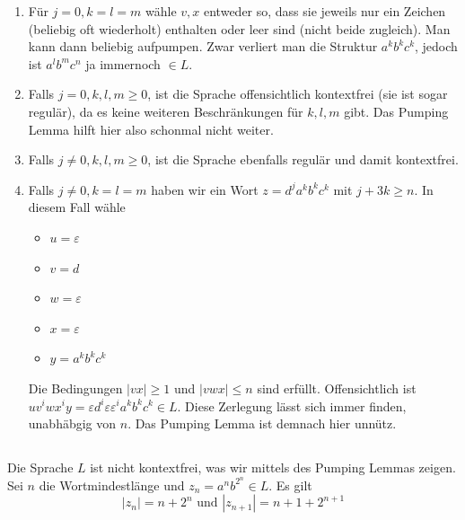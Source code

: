 \documentclass{article}
\begin{document}
\let\oldlabelenumi\labelenumi
\renewcommand{\labelenumi}{\textbf{Fall \arabic*:}}
\begin{enumerate}[leftmargin=*]
   \item Für $j = 0, k=l=m$ wähle $v,x$ entweder so, dass sie jeweils nur ein
      Zeichen (beliebig oft wiederholt) enthalten oder leer sind (nicht beide
      zugleich). Man kann dann beliebig aufpumpen. Zwar verliert man die
      Struktur $a^kb^kc^k$, jedoch ist $a^lb^mc^n$ ja immernoch $\in L$.
   \item 
      Falls $j=0,k,l,m \ge 0$, ist die Sprache offensichtlich kontextfrei (sie
      ist sogar regulär), da es keine weiteren Beschränkungen für $k,l,m$ gibt. Das
      Pumping Lemma hilft hier also schonmal nicht weiter.
   \item Falls $j \neq 0, k, l, m \ge 0$, ist die Sprache ebenfalls regulär und
      damit kontextfrei.
   \item
      Falls $j \neq 0, k = l = m$ haben wir ein Wort $z =
      d^ja^kb^kc^k$ mit $j+3k\ge n$. In diesem Fall wähle
      \begin{itemize}
         \item $u=\varepsilon$
         \item $v = d$
         \item $w=\varepsilon$
         \item $x=\varepsilon$
         \item $y=a^kb^kc^k$
      \end{itemize}
      Die Bedingungen $|vx|\ge 1$ und $|vwx| \le n$ sind erfüllt.
      Offensichtlich ist $uv^iwx^iy = \varepsilon d^i\varepsilon
      \varepsilon^ia^kb^kc^k \in L$. Diese Zerlegung lässt sich immer finden,
      unabhäbgig von $n$. Das Pumping Lemma ist demnach hier unnütz.

\end{enumerate}

\subsection{} 

Die Sprache $L$ ist nicht kontextfrei, was wir mittels des Pumping Lemmas
zeigen. Sei $n$ die Wortmindestlänge und $z_n = a^nb^{2^n} \in L$. Es gilt
\begin{equation*}
   |z_n| = n + 2^n \text{ und } |z_{n+1}| = n + 1 + 2^{n+1}
\end{equation*}
\end{document}
